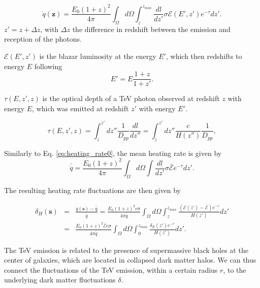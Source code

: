 \documentclass[twocolumns]{emulateapj}
\begin{document}
{\begin{equation}
  \label{eq:int_exp_heat}
  \dot{q}(\mathbf{z})=\frac{E_0(1+z)^2}{4\pi}\int_{\Omega}d\Omega\int_z^{z_{max}}\frac{dl}{dz'}\sigma\mathcal{E}(E',z') e^{-\tau} dz'.
\end{equation}
 $z'=z+\Delta z$, with $\Delta z$ the difference in redshift between the emission and reception of the photons.

$\mathcal{E}(E',z')$ is  the   blazar luminosity at the energy $E'$,  which then redshifts to energy $E$ following 
\begin{equation}
  \label{eq:E_z}
  E'=E\frac{1+z}{1+z'}.
\end{equation}

$\tau(E,z',z)$ is the optical depth of a TeV photon observed at redshift $z$ with energy $E$, which was emitted at redshift $z'$ with energy $E'$.

\begin{equation}
  \label{eq:tau}
  \tau(E,z',z)=\int_z^{z'}dz''\frac{1}{D_{pp}}\frac{dl}{dz''}=\int_z^{z'}dz''\frac{c}{H(z'')}\frac{1}{D_{pp}},
\end{equation}



Similarly to Eq. \ref{eq:heating_rate0},  the mean heating rate is given by 
\begin{equation}
  \label{eq:mean_exp_heat}
  \bar{\dot{q}}=\frac{E_0(1+z)^2}{4\pi}\int_{\Omega}d\Omega\int \frac{dl}{dz'}\sigma\bar{\mathcal{E}} e^{-\tau}dz'.
\end{equation}

The resulting heating rate fluctuations are then given by

\begin{eqnarray}
  \label{eq:fluc_exp0}
  \delta_H(\mathbf{s})&=&\frac{\dot{q}(\mathbf{s})-\bar{\dot{q}}}{\bar{\dot{q}}}=\frac{E_0(1+z)^2c\sigma}{4\pi\bar{\dot{q}}} \int_{\Omega}d\Omega\int_z^{z_{max}} \frac{ ( \mathcal{E}(z')-\bar{\mathcal{E}})  e^{-\tau}}{H(z')} dz' \\ \nonumber
  &=&\frac{E_0(1+z)^2\bar{\mathcal{E}} c\sigma}{4\pi\bar{\dot{q}}}  \int_{\Omega}d\Omega\int_0^{z_{max}}   \frac{\delta_E(z')  e^{-\tau}}{H(z')}dz'.
\end{eqnarray}

The TeV emission is related to the presence of supermassive black holes at the center of galaxies, which are located in collapsed dark matter halos.  We can thus connect the fluctuations of the TeV emission, within a certain radius $r$, to the underlying dark matter fluctuations $\delta$.

}
\end{document}
